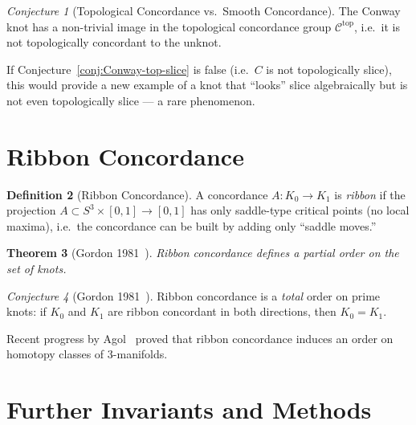 \documentclass[12pt,a4paper]{amsart}
\newtheorem{theorem}{Theorem}[section]
\theoremstyle{definition}
\newtheorem{definition}[theorem]{Definition}
\theoremstyle{remark}
\newtheorem{conjecture}[theorem]{Conjecture}
\begin{document}
\begin{conjecture}[Topological Concordance vs.\ Smooth Concordance]
\label{conj:top-vs-smooth}
The Conway knot has a non-trivial image in the topological concordance group
$\mathcal{C}^{\mathrm{top}}$, i.e.\ it is not topologically concordant to
the unknot.
\end{conjecture}

If Conjecture~\ref{conj:Conway-top-slice} is false (i.e.\ $C$ is not
topologically slice), this would provide a new example of a knot that
``looks'' slice algebraically but is not even topologically slice — a rare
phenomenon.

\section{Ribbon Concordance}

\begin{definition}[Ribbon Concordance]
A concordance $A \colon K_0 \to K_1$ is \emph{ribbon} if the projection
$A \subset S^3 \times [0,1] \to [0,1]$ has only saddle-type critical points
(no local maxima), i.e.\ the concordance can be built by adding only
``saddle moves.''
\end{definition}

\begin{theorem}[Gordon 1981~\cite{Gordon1981}]
Ribbon concordance defines a partial order on the set of knots.
\end{theorem}

\begin{conjecture}[Gordon 1981~\cite{Gordon1981}]
\label{conj:Gordon}
Ribbon concordance is a \emph{total} order on prime knots: if $K_0$ and
$K_1$ are ribbon concordant in both directions, then $K_0 = K_1$.
\end{conjecture}

Recent progress by Agol~\cite{Agol2022} proved that ribbon concordance
induces an order on homotopy classes of 3-manifolds.

\section{Further Invariants and Methods}
\end{document}
